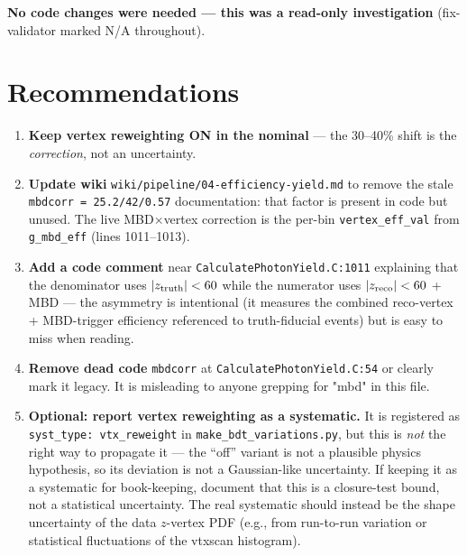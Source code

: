 \documentclass[11pt,a4paper]{article}
\begin{document}
\noindent\textbf{No code changes were needed --- this was a read-only investigation} (fix-validator marked N/A throughout).

\section*{Recommendations}

\begin{enumerate}
\item \textbf{Keep vertex reweighting ON in the nominal} --- the 30--40\% shift is the \emph{correction}, not an uncertainty.
\item \textbf{Update wiki} \texttt{wiki/pipeline/04-efficiency-yield.md} to remove the stale \texttt{mbdcorr = 25.2/42/0.57} documentation: that factor is present in code but unused. The live MBD$\times$vertex correction is the per-bin \texttt{vertex\_eff\_val} from \texttt{g\_mbd\_eff} (lines 1011--1013).
\item \textbf{Add a code comment} near \texttt{CalculatePhotonYield.C:1011} explaining that the denominator uses $|z_{\rm truth}|<60$ while the numerator uses $|z_{\rm reco}|<60$ + MBD --- the asymmetry is intentional (it measures the combined reco-vertex + MBD-trigger efficiency referenced to truth-fiducial events) but is easy to miss when reading.
\item \textbf{Remove dead code} \texttt{mbdcorr} at \texttt{CalculatePhotonYield.C:54} or clearly mark it legacy. It is misleading to anyone grepping for "mbd" in this file.
\item \textbf{Optional: report vertex reweighting as a systematic.} It is registered as \texttt{syst\_type: vtx\_reweight} in \texttt{make\_bdt\_variations.py}, but this is \emph{not} the right way to propagate it --- the ``off'' variant is not a plausible physics hypothesis, so its deviation is not a Gaussian-like uncertainty. If keeping it as a systematic for book-keeping, document that this is a closure-test bound, not a statistical uncertainty. The real systematic should instead be the shape uncertainty of the data $z$-vertex PDF (e.g., from run-to-run variation or statistical fluctuations of the vtxscan histogram).
\end{enumerate}

\end{document}
